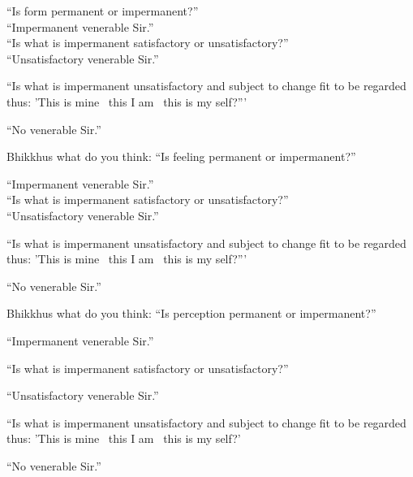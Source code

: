 \begin{english-only-nohang}
   ``Is form permanent or impermanent?''\\

  ``Impermanent venerable Sir.''\\

  ``Is what is impermanent satisfactory or unsatisfactory?''\\

  ``Unsatisfactory venerable Sir.''\\

  \begin{english-hangtogether}
    ``Is what is impermanent unsatisfactory and subject to change fit to be regarded thus: 'This is mine \breathmark\ this I am \breathmark\ this is my self?'''
  \end{english-hangtogether}

  ``No venerable Sir.''
\end{english-only-nohang}

\begin{english-only-nohang}
  Bhikkhus what do you think: ``Is feeling permanent or impermanent?''

  ``Impermanent venerable Sir.''\\

  ``Is what is impermanent satisfactory or unsatisfactory?''\\

  ``Unsatisfactory venerable Sir.''\\

  \begin{english-hangtogether}
    ``Is what is impermanent unsatisfactory and subject to change fit to be regarded thus: 'This is mine \breathmark\ this I am \breathmark\ this is my self?'''
  \end{english-hangtogether}

  ``No venerable Sir.''
\end{english-only-nohang}

\begin{english-only-nohang}
  Bhikkhus what do you think: ``Is perception permanent or impermanent?''

  ``Impermanent venerable Sir.''

  ``Is what is impermanent satisfactory or unsatisfactory?''

  ``Unsatisfactory venerable Sir.''

  \begin{english-hangtogether}
    ``Is what is impermanent unsatisfactory and subject to change fit to be regarded thus: 'This is mine \breathmark\ this I am \breathmark\ this is my self?'
  \end{english-hangtogether}

  ``No venerable Sir.''
\end{english-only-nohang}

